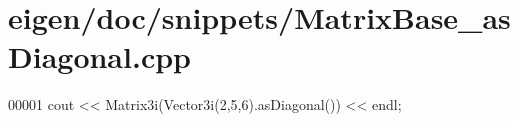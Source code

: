 \hypertarget{eigen_2doc_2snippets_2_matrix_base__as_diagonal_8cpp_source}{}\section{eigen/doc/snippets/\+Matrix\+Base\+\_\+as\+Diagonal.cpp}
\label{eigen_2doc_2snippets_2_matrix_base__as_diagonal_8cpp_source}

\begin{DoxyCode}
00001 cout << Matrix3i(Vector3i(2,5,6).asDiagonal()) << endl;
\end{DoxyCode}
